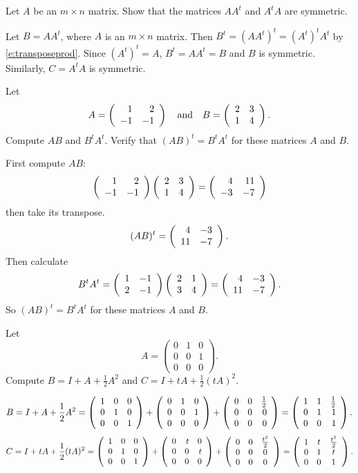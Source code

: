 \documentclass{ximera}
\begin{document}
\EXER


\TEXER


\begin{exercise} \label{c4.7.2.2}
Let $A$ be an $m\times n$ matrix.  Show that the matrices $A A^t$ and
$A^t A$ are symmetric.

\begin{solution}
Let $B = AA^t$, where $A$ is an $m \times n$ matrix.
Then $B^t = (AA^t)^t = (A^t)^tA^t$ by \eqref{e:transposeprod}.  Since
$(A^t)^t=A$, $B^t=AA^t=B$ and $B$ is symmetric.  Similarly, $C = A^tA$
is symmetric.

\end{solution}
\end{exercise}


\begin{exercise} \label{c4.7.3}
Let
\[
A=\left(\begin{array}{rr} 1 & 2\\ -1 &-1\end{array}\right) \quad\mbox{and}\quad B =\left(\begin{array}{rr} 2 & 3\\ 1 &4\end{array}\right).
\]
Compute $AB$ and $B^tA^t$.  Verify that $(AB)^t=B^tA^t$ for these
matrices $A$ and $B$.

\begin{solution}
First compute $AB$:
\[ \left(\begin{array}{rr} 1 & 2\\ -1 &-1\end{array}\right)\left(\begin{array}{rr} 2 & 3\\ 1 &4\end{array}\right) =
\left(\begin{array}{rr} 4 & 11\\ -3 &-7\end{array}\right) \]
then take its transpose.
\[ (AB)^t = \left(\begin{array}{rr} 4 & -3\\ 11 &-7\end{array}\right). \]
Then calculate
\[ B^tA^t = \left(\begin{array}{rr} 1 & -1\\ 2 &-1\end{array}\right)\left(\begin{array}{rr} 2 & 1\\ 3 &4\end{array}\right) =
\left(\begin{array}{rr} 4 & -3\\ 11 &-7\end{array}\right). \]
So $(AB)^t = B^tA^t$ for these matrices $A$ and $B$.

\end{solution}
\end{exercise}

\begin{exercise} \label{c4.7.4}
Let
\[
A = \left(\begin{array}{ccc} 0 & 1 & 0\\ 0 & 0 & 1 \\ 0 & 0 & 0 \end{array}
\right).
\]
Compute $B=I+A+\frac{1}{2}A^2$ and $C=I+tA+\frac{1}{2}(tA)^2$.

\begin{solution}

\[ 
B = I + A + \frac{1}{2}A^2 =
 \left(\begin{array}{rrr} 1 & 0 & 0 \\ 0 & 1 & 0 \\ 0 & 0 & 1\end{array}\right) +
\left(\begin{array}{rrr} 0 & 1 & 0 \\ 0 & 0 & 1 \\ 0 & 0 & 0\end{array}\right) +
\left(\begin{array}{rrr} 0 & 0 & \frac{1}{2} \\ 0 & 0 & 0 \\ 0 & 0 & 0\end{array}\right)
= \left(\begin{array}{rrr} 1 & 1 & \frac{1}{2} \\ 0 & 1 & 1 \\ 0 & 0 & 1\end{array}\right). \]
\[ 
C = I + tA + \frac{1}{2}(tA)^2 
= \left(\begin{array}{rrr} 1 & 0 & 0 \\ 0 & 1 & 0 \\ 0 & 0 & 1\end{array}\right) +
\left(\begin{array}{rrr} 0 & t & 0 \\ 0 & 0 & t \\ 0 & 0 & 0\end{array}\right) +
\left(\begin{array}{ccc} 0 & 0 & \frac{t^2}{2} \\ 0 & 0 & 0 \\ 0 & 0 & 0\end{array}\right)
= \left(\begin{array}{ccc} 1 & t & \frac{t^2}{2} \\ 0 & 1 & t \\ 0 & 0 & 1\end{array}\right). \]

\end{solution}
\end{exercise}
\end{document}
